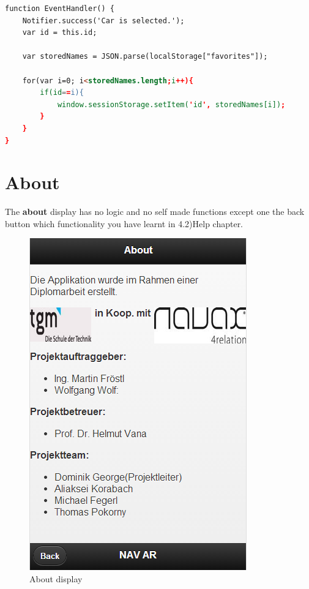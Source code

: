 \begin{lstlisting}[language=html, caption=
Select car function,captionpos=b] 
function EventHandler() {
	Notifier.success('Car is selected.');
	var id = this.id;
	
	var storedNames = JSON.parse(localStorage["favorites"]);
	
	for(var i=0; i<storedNames.length;i++){
		if(id==i){
			window.sessionStorage.setItem('id', storedNames[i]);
		}
	}
}
\end{lstlisting}

\section{About}
The \textbf{about} display has no logic and no self made functions except one the back button which functionality you have learnt in 4.2)Help chapter.
\\
\begin{figure}[h]
\centering
\includegraphics[width=0.4\linewidth]{graphics/chapter4/17}
\caption{About display}
\label{fig:18}
\end{figure}